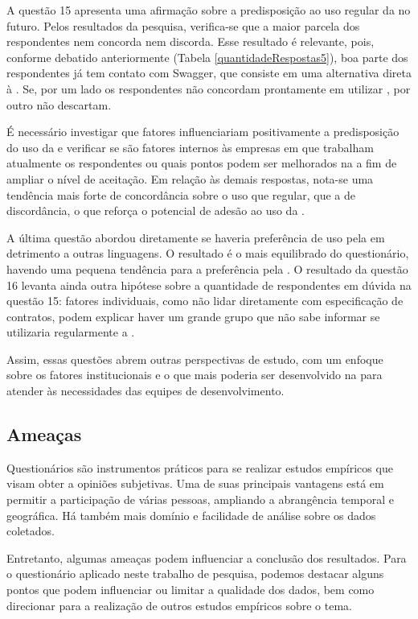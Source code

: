A questão 15 apresenta uma afirmação sobre a predisposição ao uso regular da
\neoidl{} no futuro. Pelos resultados da pesquisa, verifica-se que a maior
parcela dos respondentes nem concorda nem discorda. Esse resultado é relevante,
pois, conforme debatido anteriormente (Tabela \ref{quantidadeRespostas5}), boa
parte dos respondentes já tem contato com Swagger, que consiste em uma
alternativa direta à \neoidl{}.
Se, por um lado os respondentes não concordam prontamente em utilizar \neoidl{}, por
outro não descartam.

É necessário investigar que fatores influenciariam positivamente a predisposição
do uso da \neoidl{} e verificar se são fatores internos às empresas em que
trabalham atualmente os respondentes ou quais pontos podem ser melhorados na
\neoidl{} a fim de ampliar o nível de aceitação. Em relação às demais respostas,
nota-se uma tendência mais forte de concordância sobre o uso que regular, que
a de discordância, o que reforça o potencial de adesão ao uso da \neoidl{}.

A última questão abordou diretamente se haveria preferência de uso pela
\neoidl{} em detrimento a outras linguagens. O resultado é o mais equilibrado do
questionário, havendo uma pequena tendência para a preferência pela \neoidl{}.
O resultado da questão 16 levanta ainda outra hipótese sobre a quantidade de
respondentes em dúvida na questão 15: fatores individuais, como não lidar
diretamente com especificação de contratos, podem explicar haver um grande grupo
que não sabe informar se utilizaria regularmente a \neoidl{}.

Assim, essas questões abrem outras perspectivas de estudo, com um enfoque sobre
os fatores institucionais e o que mais poderia ser desenvolvido na \neoidl{}
para atender às necessidades das equipes de desenvolvimento.

\subsection{Ameaças}
\label{AmeacaoEstudoSubjetivo}

Questionários são instrumentos práticos para se realizar estudos empíricos que
visam obter a opiniões subjetivas. Uma de suas principais vantagens está em
permitir a participação de várias pessoas, ampliando a abrangência temporal e
geográfica. Há também mais domínio e facilidade de análise sobre os dados
coletados.

Entretanto, algumas ameaças podem influenciar a conclusão dos resultados. Para o
questionário aplicado neste trabalho de pesquisa, podemos destacar alguns pontos
que podem influenciar ou limitar a qualidade dos dados, bem como direcionar para
a rea\-li\-za\-ção de outros estudos empíricos sobre o tema.

